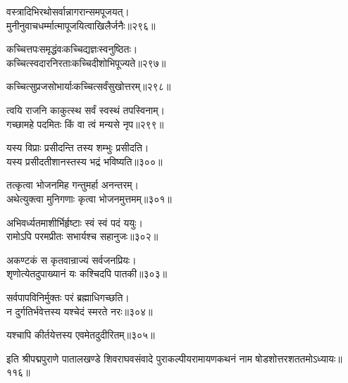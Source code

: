 \begin{flushleft}
वस्त्रादिभिरथोसर्वान्नागरान्समपूजयत्।\\
मुनीनुवाचधर्म्मात्मापूजयित्वाखिलैर्जनैः॥२९६॥

कच्चित्तपःसमृद्धंवःकच्चिद्यज्ञःस्वनुष्ठितः।\\
कच्चित्स्वदारनिरताःकच्चिदीशोभिपूज्यते॥२९७॥

कच्चित्सुप्रजसोभार्याःकच्चित्सर्वंसुखोत्तरम्॥२९८॥


त्वयि राजनि काकुत्स्थ सर्वं स्वस्थं तपस्विनाम्।\\
गच्छामहे पदमितः किं वा त्वं मन्यसे नृप॥२९९॥


यस्य विप्राः प्रसीदन्ति तस्य शम्भुः प्रसीदति।\\
यस्य प्रसीदतीशानस्तस्य भद्रं भविष्यति॥३००॥

तत्कृत्वा भोजनमिह गन्तुमर्हा अनन्तरम्।\\
अथेत्युक्त्वा मुनिगणाः कृत्वा भोजनमुत्तमम्॥३०१॥

अभिवर्ध्यतमाशीर्भिर्हृष्टाः स्वं स्वं पदं ययुः।\\
रामोऽपि परमप्रीतः सभार्यश्च सहानुजः॥३०२॥

अकण्टकं स कृतवान्राज्यं सर्वजनप्रियः।\\
शृणोत्येतदुपाख्यानं यः कश्चिदपि पातकी॥३०३॥

सर्वपापविनिर्मुक्तः परं ब्रह्माधिगच्छति।\\
न दुर्गतिर्भवेत्तस्य यश्चेदं स्मरते नरः॥३०४॥

यश्चापि कीर्तयेत्तस्य एवमेतदुदीरितम्॥३०५॥

\end{flushleft}

इति श्रीपद्मपुराणे पातालखण्डे शिवराघवसंवादे पुराकल्पीयरामायणकथनं नाम षोडशोत्तरशततमोऽध्यायः॥११६॥

